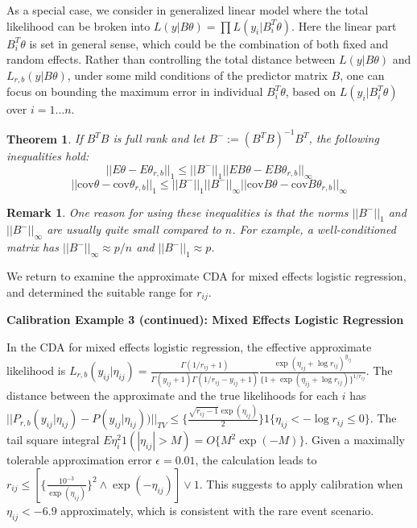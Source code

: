 \documentclass[10pt]{article}
\newtheorem{theorem}{Theorem}
\newtheorem{remark}{Remark}
\begin{document}
As a special case, we consider in generalized linear model where the total likelihood can be broken into $L(y| B\theta) = \prod  L( y_{i}| B_i^T \theta)$. Here the linear part $B_i^T \theta$ is set in general sense, which could be the combination of both fixed and random effects. Rather than controlling the total distance between $L(y| B\theta)$ and $L_{r,b}(y| B\theta)$, under some  mild conditions of the predictor matrix $B$, one can focus on bounding the maximum error in individual $B_i^T \theta$, based on $ L( y_{i}| B_i^T \theta)$ over $i=1\ldots n$.

\begin{theorem}
If $B^TB$ is full rank and let $B^{-}:=(B^TB)^{-1}B^T$, the following inequalities hold:\\
$$||{E}\theta-{E}\theta_{r,b}||_1 \le ||B^{-}||_1 ||{E}B\theta- {E}B\theta_{r,b}||_\infty$$
$$||\mbox{cov}\theta-\mbox{cov}\theta_{r,b}||_1 \le ||B^{-}||_1 ||B^{-}||_\infty ||\mbox{cov} B\theta- \mbox{cov}B\theta_{r,b}||_\infty$$
\end{theorem}

 \begin{remark}
One reason for using these inequalities is that the norms $||B^{-}||_1$ and $||B^{-}||_\infty$ are usually quite small compared to $n$.  For example, a well-conditioned matrix has $||B^{-}||_\infty\approx p/n$ and $||B^{-}||_1\approx p$.
 \end{remark}

We return to examine the approximate CDA for mixed effects logistic regression, and determined the suitable range for $r_{ij}$.

{\bf Calibration Example 3 (continued): Mixed Effects Logistic Regression}

In the CDA for mixed effects logistic regression, the effective approximate likelihood is $L_{r,b}(y_{ij}|\eta_{ij}) = \frac{\Gamma(1/r_{ij}+1)}{\Gamma(y_{ij}+1)\Gamma(1/r_{ij}-y_{ij}+1)}\frac{\exp (\eta_{ij}+ \log r_{ij})^ {y_{ij}}}{\{1+\exp (\eta_{ij}+ \log r_{ij})\}^{1/r_{ij}}}$. The distance between the approximate and the true likelihoods for each $i$ has $|| { P_{r,b}(y_{ij}|\eta_{ij}) } - {P(y_{ij}|\eta_{ij})} )||_{TV} \le   \{   \frac{\sqrt{r_{ij}-1}  \exp(\eta_{ij})}{2} \} 1 \{\eta_{ij}< - \log r_{ij} \le 0 \}$. The tail square integral $E \eta^2_i 1(|\eta_{ij}|>M) = O\{ M^2 \exp(-M)\}$. Given a maximally tolerable approximation error $\epsilon=0.01$, the calculation leads to  $r_{ij} \le  [\{\frac{10^{-3} }{\exp(\eta_{ij})}\}^2  \wedge {\exp(-\eta_{ij})} ]  \vee 1$. This suggests to apply calibration when $\eta_{ij}< -6.9$ approximately, which is consistent with the rare event scenario.
\end{document}

